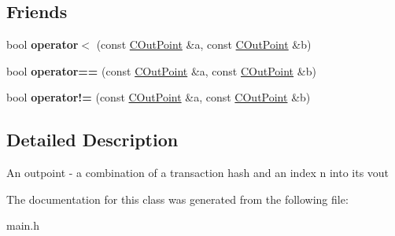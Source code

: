 \subsection*{Friends}
\begin{DoxyCompactItemize}
\item 
\mbox{\label{class_c_out_point_a83395b7e70479c621c95e1a0d7f2497c}} 
bool {\bfseries operator$<$} (const \mbox{\hyperlink{class_c_out_point}{C\+Out\+Point}} \&a, const \mbox{\hyperlink{class_c_out_point}{C\+Out\+Point}} \&b)
\item 
\mbox{\label{class_c_out_point_a30d4f5afdf664bb4ea5a3496bbc2bd12}} 
bool {\bfseries operator==} (const \mbox{\hyperlink{class_c_out_point}{C\+Out\+Point}} \&a, const \mbox{\hyperlink{class_c_out_point}{C\+Out\+Point}} \&b)
\item 
\mbox{\label{class_c_out_point_a212e1733899b0444f0e4e1e3deae33b1}} 
bool {\bfseries operator!=} (const \mbox{\hyperlink{class_c_out_point}{C\+Out\+Point}} \&a, const \mbox{\hyperlink{class_c_out_point}{C\+Out\+Point}} \&b)
\end{DoxyCompactItemize}


\subsection{Detailed Description}
An outpoint -\/ a combination of a transaction hash and an index n into its vout 

The documentation for this class was generated from the following file\+:\begin{DoxyCompactItemize}
\item 
main.\+h\end{DoxyCompactItemize}
